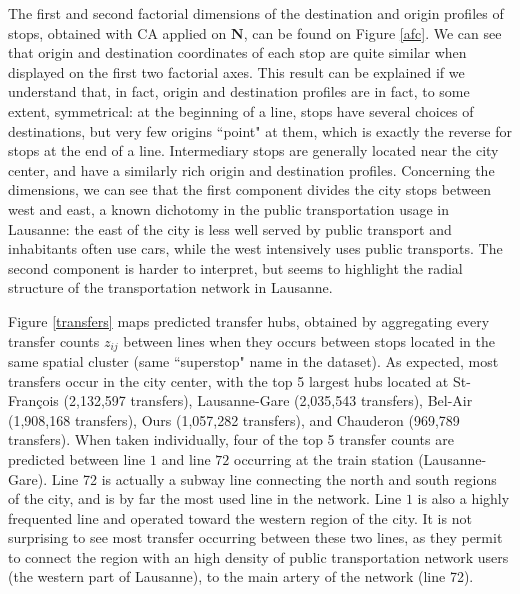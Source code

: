 \documentclass{bmcart}
\begin{document}
The first and second factorial dimensions of the destination and origin profiles of stops, obtained with CA applied on $\mathbf{N}$, can be found on Figure \ref{afc}. We can see that origin and destination coordinates of each stop are quite similar when displayed on the first two factorial axes. This result can be explained if we understand that, in fact, origin and destination profiles are in fact, to some extent, symmetrical: at the beginning of a line, stops have several choices of destinations, but very few origins ``point" at them, which is exactly the reverse for stops at the end of a line. Intermediary stops are generally located near the city center, and have a similarly rich origin and destination profiles. Concerning the dimensions, we can see that the first component divides the city stops between west and east, a known dichotomy in the public transportation usage in Lausanne: the east of the city is less well served by public transport and inhabitants often use cars, while the west intensively uses public transports. The second component is harder to interpret, but seems to highlight the radial structure of the transportation network in Lausanne.

Figure \ref{transfers} maps predicted transfer hubs, obtained by aggregating every transfer counts $z_{ij}$ between lines when they occurs between stops located in the same spatial cluster (same ``superstop" name in the dataset). As expected, most transfers occur in the city center, with the top 5 largest hubs located at St-François (2,132,597 transfers), Lausanne-Gare (2,035,543 transfers), Bel-Air (1,908,168 transfers), Ours (1,057,282 transfers), and Chauderon (969,789 transfers). When taken individually, four of the top 5 transfer counts are predicted between line $1$ and line $72$ occurring at the train station (Lausanne-Gare). Line 72 is actually a subway line connecting the north and south regions of the city, and is by far the most used line in the network. Line $1$ is also a highly frequented line and operated toward the western region of the city. It is not surprising to see most transfer occurring between these two lines, as they permit to connect the region with an high density of public transportation network users (the western part of Lausanne), to the main artery of the network (line 72).
\end{document}
